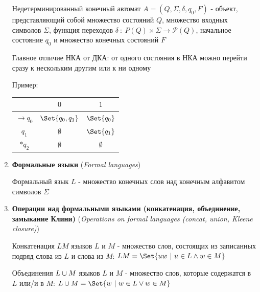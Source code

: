 \documentclass[12pt]{article}
\begin{document}
\begin{enumerate}
        Недетерминированный конечный автомат $A = (Q, \Sigma, \delta, q_0, F)$ - объект, представляющий собой множество состояний $Q$, множество входных символов $\Sigma$,
        функция переходов $\delta \ : \ P(Q) \times \Sigma \to \mathcal{P}(Q)$, начальное состояние $q_0$ и множество конечных состояний $F$

        Главное отличие НКА от ДКА: от одного состояния в НКА можно перейти сразу к нескольким другим или к ни одному

        Пример:

        \begin{multicols}{2}

            \begin{tabular}{c|cc}
                & $0$              & $1$         \\
                \hline
                $\to q_0$ & $\Set{q_0, q_1}$ & $\Set{q_0}$ \\
                \hline
                $q_1$     & $\emptyset$      & $\Set{q_1}$ \\
                \hline
                $*q_2$    & $\emptyset$      & $\emptyset$
            \end{tabular}

        \end{multicols}

        \item \textbf{Формальные языки} (\textit{Formal languages})

        Формальный язык $L$ - множество конечных слов над конечным алфавитом символов $\Sigma$

        \item \textbf{Операции над формальными языками (конкатенация, объединение, замыкание Клини)} (\textit{Operations on formal languages (concat, union, Kleene closure)})

        Конкатенация $LM$ языков $L$ и $M$ - множество слов, состоящих из записанных подряд слова из $L$ и слова из $M$: $LM = \Set{uw \ | \ u \in L \land w \in M}$

        Объединения $L \cup M$ языков $L$ и $M$ - множество слов, которые содержатся в $L$ или/и в $M$: $L \union M = \Set{w \ | \ w \in L \lor w \in M}$


\end{enumerate}
\end{document}
